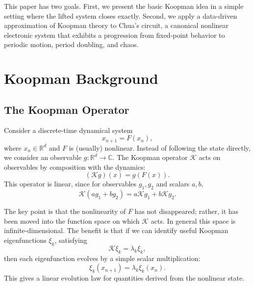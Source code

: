 \documentclass[11pt]{article}
\begin{document}
This paper has two goals. First, we present the basic Koopman idea in a simple setting where the lifted system closes exactly. Second, we apply a data-driven approximation of Koopman theory to Chua's circuit, a canonical nonlinear electronic system that exhibits a progression from fixed-point behavior to periodic motion, period doubling, and chaos.

\section{Koopman Background}

\subsection{The Koopman Operator}
Consider a discrete-time dynamical system
\begin{equation}
    x_{n+1} = F(x_n),
\end{equation}
where $x_n \in \mathbb{R}^d$ and $F$ is (usually) nonlinear. Instead of following the state directly, we consider an observable $g : \mathbb{R}^d \to \mathbb{C}$. The Koopman operator $\mathcal{K}$ acts on observables by composition with the dynamics:
\begin{equation}
    (\mathcal{K}g)(x) = g(F(x)).
\end{equation}
This operator is linear, since for observables $g_1,g_2$ and scalars $a,b$,
\begin{equation}
    \mathcal{K}(a g_1 + b g_2) = a \mathcal{K}g_1 + b \mathcal{K}g_2.
\end{equation}

The key point is that the nonlinearity of $F$ has not disappeared; rather, it has been moved into the function space on which $\mathcal{K}$ acts. In general this space is infinite-dimensional. The benefit is that if we can identify useful Koopman eigenfunctions $\xi_k$, satisfying
\begin{equation}
    \mathcal{K}\xi_k = \lambda_k \xi_k,
\end{equation}
then each eigenfunction evolves by a simple scalar multiplication:
\begin{equation}
    \xi_k(x_{n+1}) = \lambda_k \xi_k(x_n).
\end{equation}
This gives a linear evolution law for quantities derived from the nonlinear state.
\end{document}
